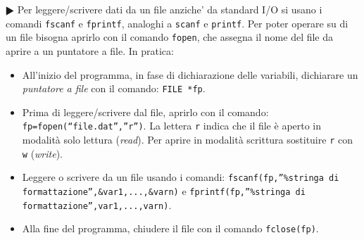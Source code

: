 \documentclass[11pt]{article}
\begin{document}
 \begin{mdframed}[backgroundcolor=panna]
\textbf{$\RHD$}
Per leggere/scrivere dati da un file anziche' da standard I/O si usano i comandi \texttt{fscanf} e \texttt{fprintf}, analoghi a  \texttt{scanf} e \texttt{printf}. Per poter operare su di un file bisogna aprirlo con il comando \texttt{fopen},
che assegna il nome del file da aprire a un puntatore a file. In pratica:
\begin{itemize}
\item All'inizio del programma, in fase di dichiarazione delle variabili, dichiarare un {\em puntatore a file} con il comando: \texttt{FILE *fp}.
\item Prima di leggere/scrivere dal file, aprirlo con il comando: 
\texttt{fp=fopen(``file.dat'',''r'')}.
La lettera \texttt{r} indica che il file \`e aperto in modalit\`a solo
lettura ({\em read}). Per aprire in modalit\`a scrittura sostituire \texttt{r} con \texttt{w} ({\em write}).
\item Leggere o scrivere da un file usando i comandi:
  \texttt{fscanf(fp,''\%stringa di formattazione'',\&var1,...,\&varn)} e
  \texttt{fprintf(fp,''\%stringa di formattazione'',var1,...,varn)}.
\item Alla fine del programma, chiudere il file con il comando
  \texttt{fclose(fp)}.
\end{itemize}

\end{mdframed}
\end{document}
